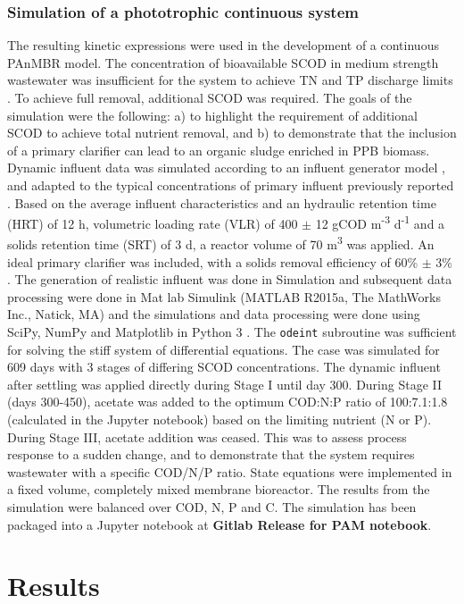 \subsubsection{Simulation of a phototrophic continuous system}
The resulting kinetic expressions were used in the development of a continuous PAnMBR model. The concentration of bioavailable SCOD in medium strength wastewater was insufficient for the system to achieve TN and TP discharge limits \cite{Hulsen2016}. To achieve full removal, additional SCOD was required. The goals of the simulation were the following: a) to highlight the requirement of additional SCOD to achieve total nutrient removal, and b) to demonstrate that the inclusion of a primary clarifier can lead to an organic sludge enriched in PPB biomass. Dynamic influent data was simulated according to an influent generator model \cite{Gernaey2011}, and adapted to the typical concentrations of primary influent previously reported \cite{Hulsen2014}. Based on the average influent characteristics and an hydraulic retention time (HRT) of 12 h, volumetric loading rate (VLR) of 400 $\pm$ 12 gCOD m\textsuperscript{-3} d\textsuperscript{-1} and a solids retention time (SRT) of 3 d, a reactor volume of 70 m\textsuperscript{3} was applied. An ideal primary clarifier was included, with a solids removal efficiency of 60\% $\pm$ 3\% \cite{Tchobanoglous}. The generation of realistic influent was done in Simulation and subsequent data processing were done in Mat
lab Simulink (MATLAB R2015a, The MathWorks Inc., Natick, MA) and the simulations and data processing were done using SciPy, NumPy and Matplotlib in Python 3 \cite{Scipy2001, NumPy2011, Hunter2007a}. The \texttt{odeint} subroutine was sufficient for solving the stiff system of differential equations. The case was simulated for 609 days with 3 stages of differing SCOD concentrations. The dynamic influent after settling was applied directly during Stage I until day
300. During Stage II (days 300-450), acetate was added to the optimum COD:N:P ratio of 100:7.1:1.8 (calculated in the Jupyter notebook) based on the limiting nutrient (N or P). During Stage III, acetate addition was ceased. This was to assess process response to a sudden change, and to demonstrate that the system requires wastewater with a specific COD/N/P ratio. State equations were implemented in a fixed volume, completely mixed membrane bioreactor. The results from the simulation were balanced over COD, N, P and C. The simulation has been packaged into a Jupyter notebook at \textbf{Gitlab Release for PAM notebook}.


\section{Results}

